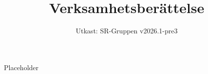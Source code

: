 \documentclass[a4paper]{dtek}
\title{Verksamhetsberättelse}
\date{Utkast: SR-Gruppen v2026.1-pre3}
\begin{document}
Placeholder
\end{document}
